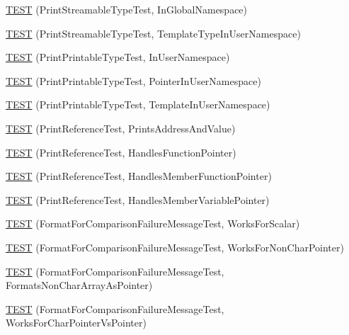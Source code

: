 \begin{DoxyCompactItemize}
\hyperlink{namespacetesting_1_1gtest__printers__test_a80fe9d71227a97b12fd5336a823c3d17}{T\+E\+ST} (Print\+Streamable\+Type\+Test, In\+Global\+Namespace)
\item 
\hyperlink{namespacetesting_1_1gtest__printers__test_a8ccd96504d676671a0429073d5012ff1}{T\+E\+ST} (Print\+Streamable\+Type\+Test, Template\+Type\+In\+User\+Namespace)
\item 
\hyperlink{namespacetesting_1_1gtest__printers__test_a52f5df394111bcc55aecc59ce426088d}{T\+E\+ST} (Print\+Printable\+Type\+Test, In\+User\+Namespace)
\item 
\hyperlink{namespacetesting_1_1gtest__printers__test_a3da6191eff6b016540024c2bfccdd90b}{T\+E\+ST} (Print\+Printable\+Type\+Test, Pointer\+In\+User\+Namespace)
\item 
\hyperlink{namespacetesting_1_1gtest__printers__test_aa697a3cf25b7f51f26ab49ed8ac3dd31}{T\+E\+ST} (Print\+Printable\+Type\+Test, Template\+In\+User\+Namespace)
\item 
\hyperlink{namespacetesting_1_1gtest__printers__test_aeae9b61a9fe582c72580db1466631846}{T\+E\+ST} (Print\+Reference\+Test, Prints\+Address\+And\+Value)
\item 
\hyperlink{namespacetesting_1_1gtest__printers__test_aab47074bb60b087e80675a44ad8c88ba}{T\+E\+ST} (Print\+Reference\+Test, Handles\+Function\+Pointer)
\item 
\hyperlink{namespacetesting_1_1gtest__printers__test_a88f9089e0b19be4bda74a953d6a47d7b}{T\+E\+ST} (Print\+Reference\+Test, Handles\+Member\+Function\+Pointer)
\item 
\hyperlink{namespacetesting_1_1gtest__printers__test_af9c63486049ac0ec2a1db65904702eb3}{T\+E\+ST} (Print\+Reference\+Test, Handles\+Member\+Variable\+Pointer)
\item 
\hyperlink{namespacetesting_1_1gtest__printers__test_aa7429c3701e464d0047a82686a5e8a46}{T\+E\+ST} (Format\+For\+Comparison\+Failure\+Message\+Test, Works\+For\+Scalar)
\item 
\hyperlink{namespacetesting_1_1gtest__printers__test_adb093d9323bfb766be8c91215c46056e}{T\+E\+ST} (Format\+For\+Comparison\+Failure\+Message\+Test, Works\+For\+Non\+Char\+Pointer)
\item 
\hyperlink{namespacetesting_1_1gtest__printers__test_a3571808f93f419268b6aed1aa127ea30}{T\+E\+ST} (Format\+For\+Comparison\+Failure\+Message\+Test, Formats\+Non\+Char\+Array\+As\+Pointer)
\item 
\hyperlink{namespacetesting_1_1gtest__printers__test_a1694d4063da702f5379495d3cb2cbc91}{T\+E\+ST} (Format\+For\+Comparison\+Failure\+Message\+Test, Works\+For\+Char\+Pointer\+Vs\+Pointer)

\end{DoxyCompactItemize}
